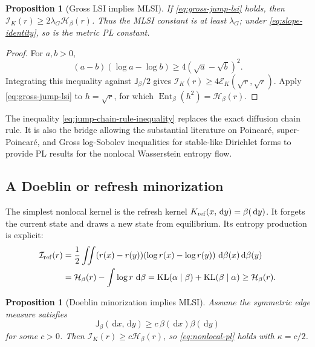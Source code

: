 \documentclass[11pt]{article}
\newtheorem{proposition}[theorem]{Proposition}
\theoremstyle{definition}
\DeclareMathOperator{\Ent}{Ent}
\DeclareMathOperator{\KL}{KL}
\newcommand{\dd}{\,\mathrm d}
\newcommand{\cE}{\mathcal E}
\newcommand{\cI}{\mathcal I}
\newcommand{\cH}{\mathcal H}
\newcommand{\Jm}{\mathsf J}
\begin{document}
\begin{proposition}[Gross LSI implies MLSI]
\label{prop:gross-implies-modified}
If \eqref{eq:gross-jump-lsi} holds, then
$\cI_K(r)\geq2\lambda_G\cH_\beta(r)$.  Thus the MLSI constant is at least
$\lambda_G$; under \eqref{eq:slope-identity}, so is the metric PL constant.
\end{proposition}

\begin{proof}
For $a,b>0$,
\begin{equation}\label{eq:jump-chain-rule-inequality}
  (a-b)(\log a-\log b)
  \geq4(\sqrt a-\sqrt b)^2.
\end{equation}
Integrating this inequality against $\Jm_\beta/2$ gives
$\cI_K(r)\geq4\cE_K(\sqrt r,\sqrt r)$.  Apply
\eqref{eq:gross-jump-lsi} to $h=\sqrt r$, for which
$\Ent_\beta(h^2)=\cH_\beta(r)$.
\end{proof}

The inequality \eqref{eq:jump-chain-rule-inequality} replaces the exact
diffusion chain rule.  It is also the bridge allowing the substantial
literature on Poincar\'e, super-Poincar\'e, and Gross log-Sobolev inequalities
for stable-like Dirichlet forms to provide PL results for the nonlocal
Wasserstein entropy flow.

\subsection{A Doeblin or refresh minorization}

The simplest nonlocal kernel is the refresh kernel
$K_{\rm ref}(x,\dd y)=\beta(\dd y)$.  It forgets the current state and draws
a new state from equilibrium.  Its entropy production is explicit:
\begin{align}
  \cI_{\rm ref}(r)
  &=\frac12\iint(r(x)-r(y))(\log r(x)-\log r(y))
       \,\dd\beta(x)\dd\beta(y)\notag\\
  &=\cH_\beta(r)-\int\log r\,\dd\beta
  =\KL(\alpha\mid\beta)+\KL(\beta\mid\alpha)
  \geq\cH_\beta(r).
  \label{eq:refresh-information}
\end{align}

\begin{proposition}[Doeblin minorization implies MLSI]
\label{prop:doeblin-pl}
Assume the symmetric edge measure satisfies
\begin{equation}\label{eq:doeblin-edge-minorization}
  \Jm_\beta(\dd x,\dd y)
  \geq c\,\beta(\dd x)\beta(\dd y)
\end{equation}
for some $c>0$.  Then
$\cI_K(r)\geq c\cH_\beta(r)$, so
\eqref{eq:nonlocal-pl} holds with $\kappa=c/2$.
\end{proposition}
\end{document}
